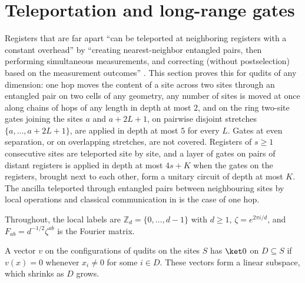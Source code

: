 
\section{Teleportation and long-range gates}
\label{sec:teleport}

Registers that are far apart ``can be teleported at neighboring registers with
a constant overhead'' by ``creating nearest-neighbor entangled pairs, then
performing simultaneous measurements, and correcting (without postselection)
based on the measurement outcomes'' \cite{Malz2024Preparation}. This section
proves this for qudits of any dimension: one hop moves the content of a site
across two sites through an entangled pair on two cells of any geometry, any
number of sites is moved at once along chains of hops of any length in depth at
most $2$, and on the ring two-site gates joining the sites $a$ and $a+2L+1$, on
pairwise disjoint stretches $\{a,\dots,a+2L+1\}$, are applied in depth at most
$5$ for every $L$. Gates at even separation, or on overlapping stretches, are
not covered. Registers of $s\ge1$ consecutive sites are teleported site by
site, and a layer of gates on pairs of distant registers is applied in depth at
most $4s+K$ when the gates on the registers, brought next to each other, form a
unitary circuit of depth at most $K$. The ancilla teleported through entangled
pairs between neighbouring sites by local operations and classical
communication in \cite{Piroli2021LOCC} is the case of one hop.

Throughout, the local labels are $\mathbb Z_d=\{0,\dots,d-1\}$ with $d\ge1$,
$\zeta=e^{2\pi i/d}$, and $F_{ab}=d^{-1/2}\zeta^{ab}$ is the Fourier matrix.

\begin{definition}
    \label{def:teleport_zero_on}
    \leanok
    A vector $v$ on the configurations of qudits on the sites $S$ has $\ket0$ on
    $D\subseteq S$ if $v(x)=0$ whenever $x_i\ne0$ for some $i\in D$. These
    vectors form a linear subspace, which shrinks as $D$ grows.
\end{definition}

